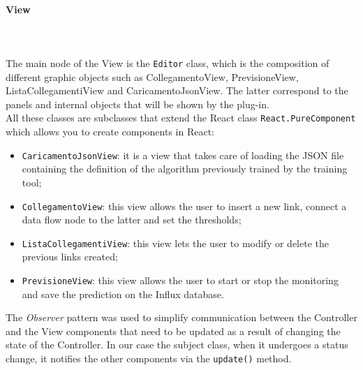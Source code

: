 \paragraph{View}\mbox{} \\ \mbox{} \\
The main node of the View is the \texttt{Editor} class, which is the composition of different graphic objects such as CollegamentoView, PrevisioneView, ListaCollegamentiView and CaricamentoJsonView. The latter correspond to the panels and internal objects that will be shown by the plug-in. \\
All these classes are subclasses that extend the React class \texttt{React.PureComponent} which allows you to create components in React:
\begin{itemize}
\item \texttt{CaricamentoJsonView}: it is a view that takes care of loading the JSON file containing the definition of the algorithm previously trained by the training tool;
\item \texttt{CollegamentoView}: this view allows the user to insert a new link, connect a data flow node to the latter and set the thresholds;
\item \texttt{ListaCollegamentiView}: this view lets the user to modify or delete the previous links created;
\item \texttt{PrevisioneView}: this view allows the user to start or stop the monitoring and save the prediction on the Influx database.
\end{itemize}
The \textit{Observer} pattern was used to simplify communication between the Controller and the View components that need to be updated as a result of changing the state of the Controller. In our case the subject class, when it undergoes a status change, it notifies the other components via the \texttt{update()} method.

